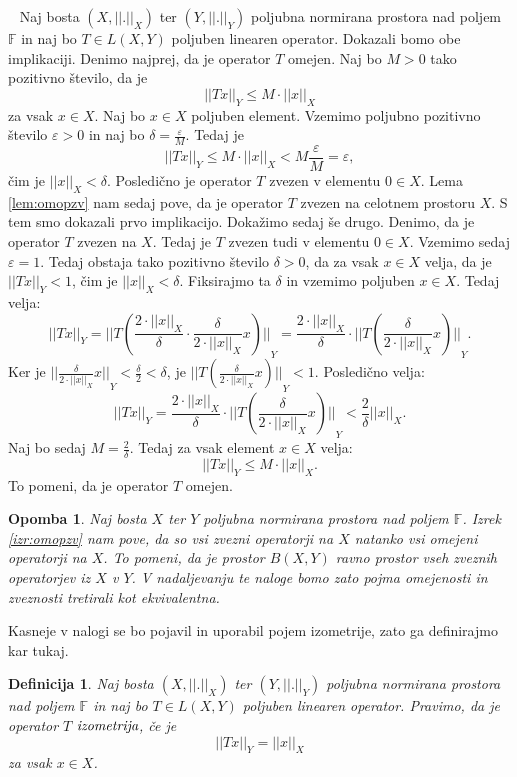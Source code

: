 \documentclass[12pt,a4paper,oneside,fleqn,openany]{book}
\newtheorem{definicija}[izrek]{Definicija}
\newtheorem{opomba}[izrek]{Opomba}
\newcommand{\eopf}{\raisebox{0.8ex}{\framebox{}}} %
\newenvironment{dokaz}%
{\noindent{\bf Dokaz.}\ }%
{\hfill\eopf\par\bigskip}%
\newcommand{\F}{\mathbb{F}}
\newcommand{\abs}[1]{\ensuremath{\lvert #1 \rvert}}
\newcommand{\norm}[1]{\abs{\abs{#1}}}
\newcommand{\pojem}[1]{\ensuremath{\emph{#1}}}
\begin{document}
\begin{dokaz}
	Naj bosta $(X, \norm{.}_X)$ ter $(Y, \norm{.}_Y)$ poljubna normirana prostora nad poljem $\F$ in naj bo $T\in L(X, Y)$ poljuben linearen operator. Dokazali bomo obe implikaciji.
	Denimo najprej, da je operator $T$ omejen. Naj bo $M>0$ tako pozitivno število, da je $$\norm{Tx}_Y\leq M\cdot\norm{x}_X$$ za vsak $x\in X$. Naj bo $x\in X$ poljuben element. Vzemimo poljubno pozitivno število $\varepsilon>0$ in naj bo $\delta = \frac{\varepsilon}{M}$. Tedaj je $$\norm{Tx}_Y \leq M\cdot \norm{x}_X < M\frac{\varepsilon}{M}=\varepsilon,$$ čim je $\norm{x}_X < \delta$. Posledično je operator $T$ zvezen v elementu $0\in X$. Lema \ref{lem:omopzv} nam sedaj pove, da je operator $T$ zvezen na celotnem prostoru $X$. S tem smo dokazali prvo implikacijo. Dokažimo sedaj še drugo.
	Denimo, da je operator $T$ zvezen na $X$. Tedaj je $T$ zvezen tudi v elementu $0\in X$. Vzemimo sedaj $\varepsilon=1$. Tedaj obstaja tako pozitivno število $\delta>0$, da za vsak $x\in X$ velja, da je $\norm{Tx}_Y<1$, čim je $\norm{x}_X < \delta$. Fiksirajmo ta $\delta$ in vzemimo poljuben $x\in X$. Tedaj velja: $$\norm{Tx}_Y = \norm{T(\frac{2\cdot\norm{x}_X}{\delta}\cdot\frac{\delta}{2\cdot\norm{x}_X}x)}_Y = \frac{2\cdot\norm{x}_X}{\delta}\cdot\norm{T(\frac{\delta}{2\cdot\norm{x}_X}x)}_Y .$$ Ker je $\norm{\frac{\delta}{2\cdot\norm{x}_X}x}_Y<\frac{\delta}{2}<\delta$, je $\norm{T(\frac{\delta}{2\cdot\norm{x}_X}x)}_Y<1$. Posledično velja: $$\norm{Tx}_Y=\frac{2\cdot\norm{x}_X}{\delta}\cdot\norm{T(\frac{\delta}{2\cdot\norm{x}_X}x)}_Y <\frac{2}{\delta}\norm{x}_X.$$ Naj bo sedaj $M=\frac{2}{\delta}$. Tedaj za vsak element $x\in X$ velja: $$\norm{Tx}_Y \leq M\cdot\norm{x}_X.$$ To pomeni, da je operator $T$ omejen.
\end{dokaz}

\begin{opomba}
	 \label{opomb:omopzv}
	 Naj bosta $X$ ter $Y$ poljubna normirana prostora nad poljem $\F$. Izrek \ref{izr:omopzv} nam pove, da so vsi zvezni operatorji na $X$ natanko vsi omejeni operatorji na $X$. To pomeni, da je prostor $B(X, Y)$ ravno prostor vseh zveznih operatorjev iz $X$ v $Y$. V nadaljevanju te naloge bomo zato pojma omejenosti in zveznosti tretirali kot ekvivalentna.
\end{opomba}
Kasneje v nalogi se bo pojavil in uporabil pojem izometrije, zato ga definirajmo kar tukaj.
\begin{definicija}
	\label{def:izometrija}
	Naj bosta $(X, \norm{.}_X)$ ter $(Y, \norm{.}_Y)$ poljubna normirana prostora nad poljem $\F$ in naj bo $T\in L(X, Y)$ poljuben linearen operator. Pravimo, da je operator $T$ \pojem{izometrija}, če je $$\norm{Tx}_Y = \norm{x}_X$$ za vsak $x\in X$.
\end{definicija}
\end{document}
